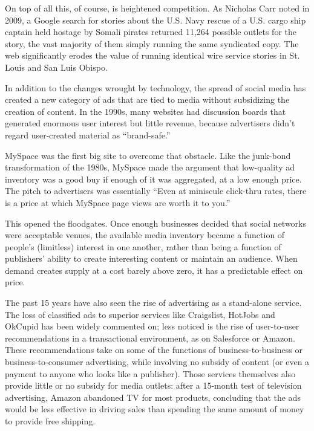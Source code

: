 On top of all this, of course, is heightened competition. As Nicholas Carr noted
in 2009, a Google search for stories about the U.S. Navy rescue of a U.S. cargo
ship captain held hostage by Somali pirates returned 11,264 possible outlets for
the story, the vast majority of them simply running the same syndicated copy.
The web significantly erodes the value of running identical wire service stories
in St. Louis and San Luis Obispo.

In addition to the changes wrought by technology, the spread of social media
has created a new category of ads that are tied to media without subsidizing the
creation of content. In the 1990s, many websites had discussion boards that generated
enormous user interest but little revenue, because advertisers didn’t regard
user-created material as ``brand-safe.''

MySpace was the first big site to overcome that obstacle. Like the junk-bond
transformation of the 1980s, MySpace made the argument that low-quality ad
inventory was a good buy if enough of it was aggregated, at a low enough price.
The pitch to advertisers was essentially ``Even at miniscule click-thru rates, there
is a price at which MySpace page views are worth it to you.''

This opened the floodgates. Once enough businesses decided that social networks
were acceptable venues, the available media inventory became a function
of people’s (limitless) interest in one another, rather than being a function
of publishers’ ability to create interesting content or maintain an audience.
When demand creates supply at a cost barely above zero, it has a predictable
effect on price.

The past 15 years have also seen the rise of advertising as a stand-alone service.
The loss of classified ads to superior services like Craigslist, HotJobs and
OkCupid has been widely commented on; less noticed is the rise of user-to-user
recommendations in a transactional environment, as on Salesforce or Amazon.
These recommendations take on some of the functions of business-to-business
or business-to-consumer advertising, while involving no subsidy of content (or
even a payment to anyone who looks like a publisher). Those services themselves
also provide little or no subsidy for media outlets: after a 15-month test of television
advertising, Amazon abandoned TV for most products, concluding that the
ads would be less effective in driving sales than spending the same amount of
money to provide free shipping.

